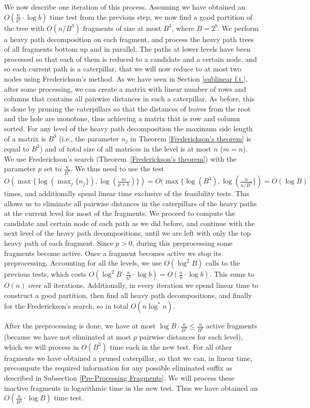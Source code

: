 \documentclass[a4paper,UKenglish]{lipics-v2016}
\theoremstyle{plain}
\begin{document}
We now describe one iteration of this process. Assuming we have obtained an $O(\frac{n}{b^3} \cdot \log b)$ time 
test from the previous step, we now find a good partition of the tree with $O(n/B^{3})$ fragments of size at most $B^3$, 
where $B=2^b$. We perform a heavy path decomposition on each fragment, and process the heavy
path trees of all fragments bottom up and in parallel. The paths at lower levels have been processed so that each of them is
reduced to a candidate and a certain node, and so each current path is a caterpillar, that we will now reduce to at most two nodes using Frederickson's method. As we have seen in Section \ref{sublinear f.t.}, after some processing, we can create a matrix 
with linear number of rows and columns that contains all pairwise distances in such a caterpillar. As before, this is done by pruning the caterpillars so that the distances of leaves from the root and the hole are monotone, thus achieving a matrix that is row and column sorted. For any level of the heavy path decomposition the maximum side length of a matrix is $B^{3}$ (i.e., the parameter $n_j$ in Theorem \ref{Frederickson's theorem} is equal to $B^3$) and of total size of all matrices in the level is at most $n$ ($m=n$).
We use Frederickson's search (Theorem~\ref{Frederickson's theorem}) with the parameter $p$ set to $\frac{n}{B^7}$. We thus need to use the
test $O(\max \lbrace \log(\max_{j} \lbrace n_j \rbrace), \log(\frac{m}{p+1}) \rbrace) = O(\max \lbrace \log (B^{3}), \log(\frac{n}{n/B^{7}} \rbrace) = O(\log B)$ times, and additionally spend linear time exclusive of the feasibility tests. This allows us to eliminate all pairwise distances in the caterpillars of the heavy paths at the current level for most of the fragments. We proceed to compute the candidate and certain node of each path as we did before, and continue with the next level
of the heavy path decompositions, until we are left with only the top heavy path of each fragment.
Since $p>0$, during this preprocessing some fragments become active. Once a fragment becomes active we stop
its preprocessing. Accounting for all the levels, we use $O(\log^{2}B)$ calls to the previous tests,
which costs $O(\log ^2B \cdot \frac{n}{b^3} \cdot \log b)=O(\frac{n}{b} \cdot \log b)$. This sums to $O(n)$
over all iterations.
Additionally, in every iteration we spend linear time to construct a good partition, then find all heavy
path decompositions, and finally for the Frederickson's search, so in total $O(n \log ^*n)$. 

After the preprocessing is done, we have at most $\log B \cdot \frac{n}{B^7}\leq \frac{n}{B^{6}}$ active fragments (because we have not eliminated at most $p$ pairwise distances for each level), which we will process in $O(B^{3})$
time each in the new test. For all other fragments we have obtained a pruned caterpillar, so that we can, in linear time, precompute the required information for any possible eliminated suffix as described in Subsection \ref{Pre-Processing Fragments}. We will process these inactive fragments in logarithmic time in the new test. Thus we have obtained an $O(\frac{n}{B^3} \cdot \log B)$ time test.
\end{document}

